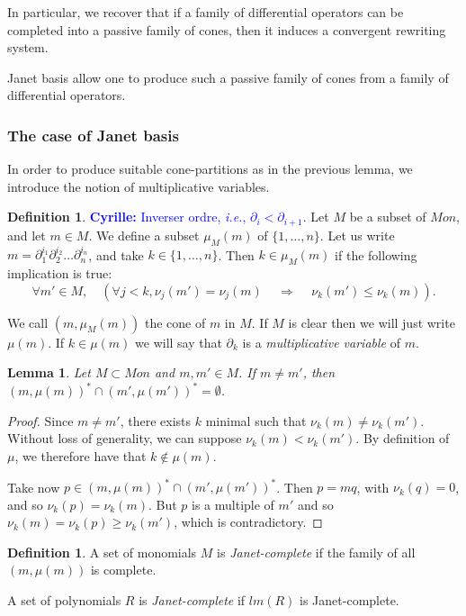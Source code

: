 \documentclass[10pt]{easychair}
\newtheorem{lemma}[theorem]{Lemma}
\theoremstyle{definition}
\newtheorem{definition}[theorem]{Definition}
\newcommand\ie{\emph{i.e.}}
\newcommand\fixmecc[1]{{\textcolor{blue}{{\bf Cyrille:} #1}}}
\begin{document}
In particular, we recover that if a family of differential operators can be
completed into a passive family of cones,
then it induces a convergent rewriting system.

Janet basis allow one to produce such a passive family of cones from a
family of differential operators.

\subsubsection{The case of Janet basis}

In order to produce suitable cone-partitions as in the previous lemma,
we introduce the notion of multiplicative variables.

\begin{definition}
  \fixmecc{Inverser ordre, \ie, $\partial_i<\partial_{i+1}$.}
  Let $M$ be a subset of $Mon$, and let $m  \in M$. We define a subset $\mu_M(m)$
  of $\{1,\ldots,n\}$. Let us write $m = \partial_1^{i_1}\partial_2^{i_2}\ldots \partial_n^{i_n}$, and take
  $k \in \{1,\ldots,n\}$. Then $k \in \mu_M(m)$ if the following implication is true:
  \[
\forall m' \in M, \quad (\forall j < k, \nu_j(m') = \nu_j(m) \, \quad \Rightarrow \quad \, \nu_k(m') \leq \nu_k(m)).
  \]
  

  We call $(m,\mu_M(m))$ the cone of $m$ in $M$. If $M$ is clear then we will
  just write $\mu(m)$. If $k \in \mu(m)$ we will say that $\partial_k$ is a
  \emph{multiplicative variable} of $m$.
\end{definition}

\begin{lemma}\label{lem:multiplicative_cones_disjoint}
Let $M \subset Mon$ and $m,m' \in M$. If $m \neq m'$, then $(m,\mu(m))^* \cap (m',\mu(m'))^* = \emptyset$.
\end{lemma}
\begin{proof}
  Since $m \neq m'$, there exists $k$ minimal such that $\nu_k(m) \neq \nu_k(m')$.
  Without loss of generality, we can suppose $\nu_k(m) < \nu_k(m')$.
  By definition of $\mu$, we therefore have that $k \notin \mu(m)$.

  Take now $p \in (m,\mu(m))^* \cap (m',\mu(m'))^*$. Then $p = mq$, with $\nu_k(q) = 0$,
  and so $\nu_k(p) = \nu_k(m)$. But $p$ is a multiple of $m'$ and so
  $\nu_k(m) = \nu_k(p) \geq \nu_k(m')$, which is contradictory.
 \end{proof}


 \begin{definition}
   A set of monomials $M$ is \emph{Janet-complete} if the family of
   all $(m,\mu(m))$ is complete.

   A set of polynomials $R$ is \emph{Janet-complete} if $lm(R)$ is
   Janet-complete.
 \end{definition}
\end{document}
